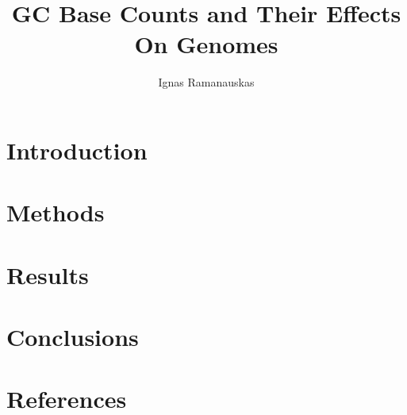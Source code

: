 \documentclass{article}
\author{Ignas Ramanauskas}
\title{\textbf{GC Base Counts and Their Effects On Genomes}}
\begin{document}
\maketitle

\section{Introduction}


\section{Methods}


\clearpage
\section{Results}


\section{Conclusions}


\section{References}
\cite{Vinogradov2003}

\end{document}

